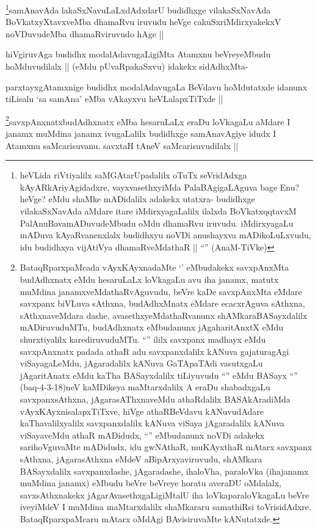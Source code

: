 \begin{artha}
\footnote{heVLida riVtiyalilx saMGAtarUpadalilx oTuTx seVridAdxga kAyARkAriyAgidadxre, vayxvasethxyiMda PalaBAgigaLAguva bage Enu? heVge? eMdu shaMke mADidalilx adakekx utatxra- budidhxge vilakaSxNavAda aMdare itare iMdirxyagaLalilx  ilalxda BoVkatxqqtavxM PalAnuBavamADuvudeMbudu oMdu dhamaRvu iruvudu. iMdirxyagaLu mADuva kAyaRvanenxlalx budidhxyu noVDi anushayxva mADikoLuLxvudu, idu budidhxya vijAtiVya dhamaRveMdathaR || ``\stext'' (AnaM-TiVke)}samAnavAda lakaSxNavuLaLxdAdxdarU budidhxge vilakaSxNavAda BoVkatxyXtavxveMba dhamaRvu iruvudu heVge cakuSxriMdirxyakekxV noVDuvudeMba dhamaRviruvudo hAge ||
\end{artha}

\begin{artha}
hiVgiruvAga  budidhx modalAdavugaLigiMta Atamxnu beVreyeMbudu hoMduvudilalx || (eMdu pUvaRpakaSxvu) idakekx sidAdhxMta- 
\end{artha}

\begin{artha}
parxtayxgAtamxnige budidhx modalAdavugaLa BeVdavu hoMdutatxde idanunx tiLisalu `sa samAna' eMba vAkayxvu heVLalapxTiTxde ||
\end{artha}

\begin{artha}
\footnote{BataqRparxpaMcada vAyxKAyxnadaMte `\stext' eMbudakekx savxpAnxMta budAdhxnatx eMdu hesaruLaLx loVkagaLu avu iha janamx, matutx muMdina janamxveMdathaRvAguvudu, beVre kaDe savxpAnxMta eMdare savxpanx biVLuva sAthxna, budAdhxMnatx eMdare ecacxrAguva sAthxna, sAthxnaveMdara dashe, avasethxyeMdathaRvanunx shAMkaraBASayxdalilx mADiruvuduMTu, budAdhxnatx eMbudanunx jAgaharitAnxtX eMdu shurxtiyalilx karediruvuduMTu. ``\stext'' ililx savxpanx madhayx eMdu savxpAnxnatx padada athaR adu savxpanxdalilx kANuva gajaturagAgi viSayagaLeMdu, jAgaradalilx kANuva GaTApaTAdi vasutxgaLu jAgaritAnatx eMdu kaTha BASayxdalilx tiLiyuvudu ``\stext'' eMdu BASayx ``\stext'' (baq-4-3-18)neV kaMDikeya maMtarxdalilx A eraDu shabadxgaLu savxpanxsAthxna, jAgarasAThxnaveMdu athaRdalilx BASAkAradiMda vAyxKAyxnisalapxTiTxve, hiVge athaRBeVdavu kANuvudAdare kaThavalilxyalilx savxpanxdalilx kANuva viSaya jAgaradalilx kANuva viSayaveMdu athaR mADidudx, ``\stext'' eMbudanunx noVDi adakekx sarihoVguvaMte mADidudx, idu gwNAthaR, muKAyxthaR mAtarx savxpanx sAthxna, jAgarasAthxna eMdeV aBipArxyaviruvudu, shAMkara BASayxdalilx savxpanxdashe, jAgaradashe, ihaloVha, paraloVka (ihajanamx muMdina janamx) eMbudu beVre beVreye horatu averaDU oMdalalx, savxsAthxnakekx jAgarAvasethxgaLigiMtalU iha loVkaparaloVkagaLu beVre iveyiMdeV I muMdina maMtarxdalilx shaMkararu samathiRsi toVrisidAdxre. BataqRparxpaMcaru mAtarx oMdAgi BAvisiruvaMte kANutatxde.}savxpAnxnatxbudAdhxnatx eMba hesaruLaLx eraDu loVkagaLu aMdare I janamx muMdina janamx ivugaLalilx budidhxge samAnavAgiye idudx I Atamxnu saMcarisuvanu. savxtaH tAneV saMcarisuvudilalx ||
\end{artha}

